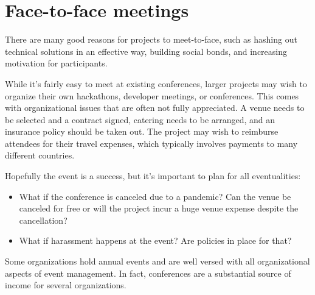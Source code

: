 


\chapter{Face-to-face meetings}

There are many good reasons for projects to meet-to-face, such as hashing out technical solutions in an effective way, building social bonds, and increasing motivation for participants.

While it's fairly easy to meet at existing conferences, larger projects may wish to organize their own hackathons, developer meetings, or conferences.  This comes with organizational issues that are often not fully appreciated.  A venue needs to be selected and a contract signed, catering needs to be arranged, and an insurance policy should be taken out.  The project may wish to reimburse attendees for their travel expenses, which typically involves payments to many different countries.

Hopefully the event is a success, but it's important to plan for all eventualities:

\begin{itemize}

\itemsep 0.50em

\item What if the conference is canceled due to a pandemic? Can the venue be canceled for free or will the project incur a huge venue expense despite the cancellation?
\item What if harassment happens at the event?  Are policies in place for that?

\end{itemize}

Some organizations hold annual events and are well versed with all organizational aspects of event management.  In fact, conferences are a substantial source of income for several organizations.

